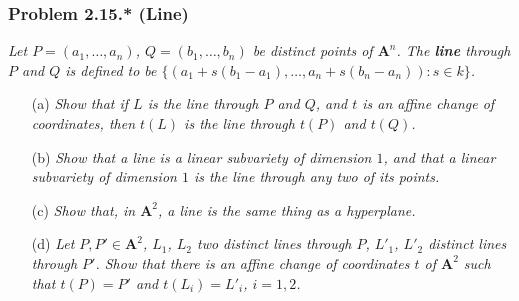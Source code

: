 \documentclass{article}
\begin{document}



\subsubsection*{Problem 2.15.* (Line)}
\emph{Let $P = (a_1, \ldots, a_n)$, $Q = (b_1, \ldots, b_n)$ be distinct points of $\mathbf{A}^{n}$.
The \textbf{line} through $P$ and $Q$ is defined to be
$\{ ( a_1 + s(b_1-a_1), \ldots, a_n + s(b_n-a_n) ) : s \in k \}$.}
\begin{enumerate}
\item[(a)]
  \emph{Show that if $L$ is the line through $P$ and $Q$, and $t$ is an affine change of coordinates,
  then $t(L)$ is the line through $t(P)$ and $t(Q)$.}

\item[(b)]
  \emph{Show that a line is a linear subvariety of dimension $1$,
  and that a linear subvariety of dimension $1$ is the line through any two of its points.}

\item[(c)]
  \emph{Show that, in $\mathbf{A}^{2}$, a line is the same thing as a hyperplane.}

\item[(d)]
  \emph{Let $P, P' \in \mathbf{A}^{2}$, $L_1$, $L_2$ two distinct lines through $P$,
  $L'_1$, $L'_2$ distinct lines through $P'$.
  Show that there is an affine change of coordinates $t$ of $\mathbf{A}^{2}$
  such that $t(P) = P'$ and $t(L_i) = L'_i$, $i = 1, 2$.} \\
\end{enumerate}
\end{document}

